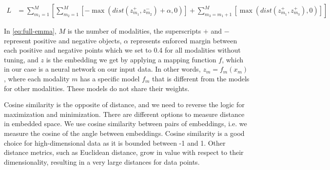 \documentclass[10pt]{article} %
\begin{document}
\begin{equation}\label{eq:full-emma}
\begin{split}
    L &= \sum_{m_1=1}^{M} \left[ \sum_{m_2=1}^{M} \left[ -\max (dist(z_{m_1}^{+}, z_{m_2}^{-}) + \alpha,0) \right] + \sum_{m_3=m_1+1}^{M} \left[ \max( dist(z_{m_1}^{+},z_{m_3}^{+}),0) \right] \right]
\end{split}
\end{equation}

In \cref{eq:full-emma}, $M$ is the number of modalities, the superscripts $+$ and $-$ represent positive and negative objects, $\alpha$ represents enforced margin between each positive and negative points which we set to 0.4 for all modalities without tuning, and $z$ is the embedding we get by applying a mapping function $f$, which in our case is a neural network on our input data.
In other words, $z_m = f_m(x_m)$, where each modality $m$ has a specific model $f_m$ that is different from the models for other modalities. These models do not share their weights. 


Cosine similarity is the opposite of distance, and we need to reverse the logic for maximization and minimization. 
% 
There are different options to measure distance in embedded space. We use cosine similarity between pairs of embeddings, i.e. we measure the cosine of the angle between embeddings. Cosine similarity is a good choice for high-dimensional data as it is bounded between -1 and 1. Other distance metrics, such as Euclidean distance, grow in value with respect to their dimensionality, resulting in a very large distances for data points. 
\end{document}
